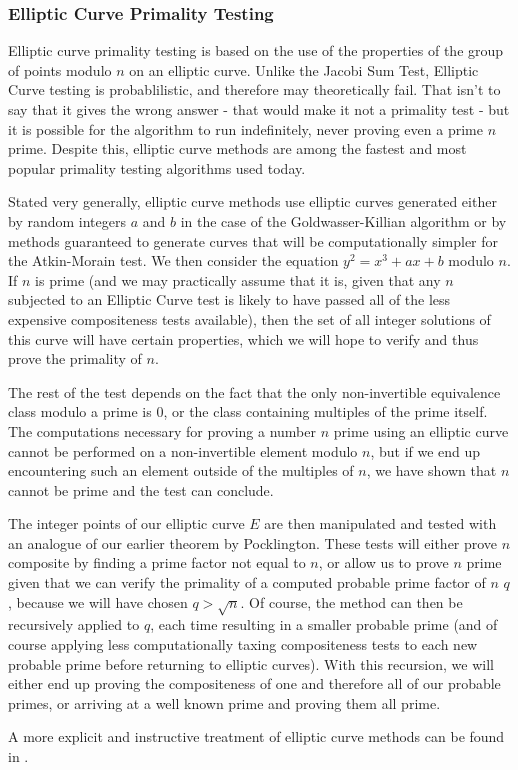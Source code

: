 \documentclass{article}
\begin{document}
\subsubsection*{Elliptic Curve Primality Testing}

Elliptic curve primality testing is based on the use of the properties of the group of points modulo $n$ on an elliptic curve. Unlike the Jacobi Sum Test, Elliptic Curve testing is probablilistic, and therefore may theoretically fail. That isn't to say that it gives the wrong answer - that would make it not a primality test - but it is possible for the algorithm to run indefinitely, never proving even a prime $n$ prime.  Despite this, elliptic curve methods are among the fastest and most popular primality testing algorithms used today.
\par Stated very generally, elliptic curve methods use elliptic curves generated either by random integers $a$ and $b$ in the case of the Goldwasser-Killian algorithm or by methods guaranteed to generate curves that will be computationally simpler for the Atkin-Morain test. We then consider the equation $y^2 = x^3 + ax + b$ modulo $n$. If $n$ is prime (and we may practically assume that it is, given that any $n$ subjected to an Elliptic Curve test is likely to have passed all of the less expensive compositeness tests available), then the set of all integer solutions of this curve will have certain properties, which we will hope to verify and thus prove the primality of $n$.
\par The rest of the test depends on the fact that the only non-invertible equivalence class modulo a prime is $0$, or the class containing multiples of the prime itself. The computations necessary for proving a number $n$ prime using an elliptic curve cannot be performed on a non-invertible element modulo $n$,  but if we end up encountering such an element outside of the multiples of $n$, we have shown that $n$ cannot be prime and the test can conclude. 
\par The integer points of our elliptic curve $E$ are then manipulated and tested with an analogue of our earlier theorem by Pocklington. These tests will either prove $n$ composite by finding a prime factor not equal to $n$, or allow us to prove $n$ prime given that we can verify the primality of a computed probable prime factor of $n$ $q$, because we will have chosen $q > \sqrt{n}$. Of course, the method can then be recursively applied to $q$, each time resulting in a smaller probable prime (and of course applying less computationally taxing compositeness tests to each new probable prime before returning to elliptic curves). With this recursion, we will either end up proving the compositeness of one and therefore all of our probable primes, or arriving at a well known prime and proving them all prime. 
\par A more explicit and instructive treatment of elliptic curve methods can be found in \citep{koblitz}.





\end{document}
